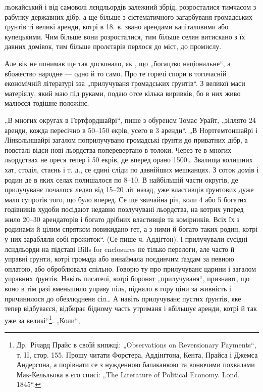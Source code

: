 \parcont{}
льокайський і від самоволі лєндльордів залежний збрід, розросталися тимчасом з рабунку державних
дібр, а ще більше з сістематичного загарбуваня громадських ґрунтів ті великі аренди, котрі в 18. в.
звано арендами капіталовими або купецькими. Чим більше вони розросталися, тим більше селян витискано
з їх давних домівок, тим більше пролєтарів перлося до міст, до промислу.

Але  вік не понимав ще так досконало, як , що „богацтво національне“, а вбожество народне —
одно й то само. Про те горячі спори в тогочасній економічній літературі зза „прилучуваня громадських
ґрунтів“. З великої
маси матеріялу, який маю під руками, подаю отсе кілька виривків, бо в них живо малюєся тодішне
положінє.

„В многих округах в Гертфордшайрі“, пише з обуренєм Томас Урайт, „зіллято 24 аренди, кожда пересічно
в 50--150 екрів, усего в 3 аренди“. „В Нортгемтоншайрі і Лінкольншайрі загалом поприлучувано
громадські ґрунти до приватних дібр, а повсталі відси нові льордства поперевертано в толоки. Через
те в многих льордствах не ореся тепер і 50 екрів, де вперед орано 1500\dots{} Звалища колишних хат,
стоділ, стаєнь і т. д., се єдині сліди по давнійших мешканцях. З соток домів і родин де в яких селах
полишалося по 8--10. В найбільшій части округів, де прилучуванє почалося ледво від 15--20 літ назад,
уже властивців ґрунтових дуже мало супротів того, що було вперед. Се ще звичайна річ, коли 4 або 5
богатих годівників худоби посідают недавно позлучувані льордства, на котрих уперед жило 20--30
арендаторів і богато
дрібних властивців та комірників. Всіх їх з родинами й цілим спрятком
повикидано гет, а з ними й богато таких родин, котрі у них зарабляли собі прожиток“. (Се пише ч.
Аддіґтон). І прилучували сусідні лєндльорди на підставі Bills for enclosures не тілько перелоги, але
часто й управні ґрунти, котрі громада або винаймала поєдинчим ґаздам за певною оплатою, або
оброблювала спільно. Говорю ту про прилучуванє царини
і загалом управних ґрунтів. Навіть писателі, котрі боронят „прилучуваня“, признают, що воно в тім
разі вменьшило управу піль, підняло в гору ціни за живність і причинилося до обезлюдненя сіл\dots{} А
навіть прилучуванє пустих ґрунтів, яке тепер відбуваєся, відбирає бідному часть утриманя
і вбільшує аренди, котрі й так уже за великі“\footnote{
Др.~Річард Прайс в своїй кнпжці: „Observations on Reversionary
Payments“, т. II, стор. 155. Прошу читати Форстера, Аддінґтона, Кента,
Прайса і Джемса Андерсона, а порівнати се з нужденною балаканкою
та вонючими похвалами Мак-Кельльока в єго списі: „The Literature of
Political Economy. Lond. 1845“.
}. „Коли“,
\parbreak{}
